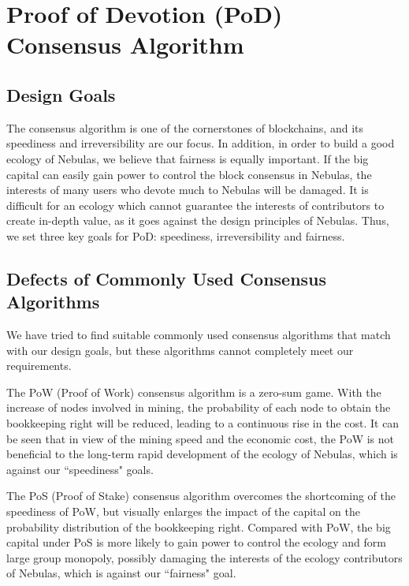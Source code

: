 \section{Proof of Devotion (PoD) Consensus Algorithm}
\label{sec:pod}

\subsection{Design Goals}
\label{pod:goals}

The consensus algorithm is one of the cornerstones of blockchains, and its speediness and irreversibility are our focus. In addition, in order to build a good ecology of Nebulas, we believe that fairness is equally important. If the big capital can easily gain power to control the block consensus in Nebulas, the interests of many users who devote much to Nebulas will be damaged. It is difficult for an ecology which cannot guarantee the interests of contributors to create in-depth value, as it goes against the design principles of Nebulas. Thus, we set three key goals for PoD: speediness, irreversibility and fairness.

\subsection{Defects of Commonly Used Consensus Algorithms}
\label{pod:weakness}

We have tried to find suitable commonly used consensus algorithms that match with our design goals, but these algorithms cannot completely meet our requirements.

The PoW (Proof of Work) consensus algorithm is a zero-sum game. With the increase of nodes involved in mining, the probability of each node to obtain the bookkeeping right will be reduced, leading to a continuous rise in the cost. It can be seen that in view of the mining speed and the economic cost, the PoW is not beneficial to the long-term rapid development of the ecology of Nebulas, which is against our ``speediness" goals.

The PoS (Proof of Stake) consensus algorithm overcomes the shortcoming of the speediness of PoW, but visually enlarges the impact of the capital on the probability distribution of the bookkeeping right. Compared with PoW, the big capital under PoS is more likely to gain power to control the ecology and form large group monopoly, possibly damaging the interests of the ecology contributors of Nebulas, which is against our ``fairness" goal.

